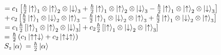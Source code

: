 \documentclass[12pt]{article}
\begin{document}
\hspace*{3em}$=c_1\left[\frac{\hbar}{2}\ket{\uparrow}_1\otimes \ket{\uparrow}_2\otimes \ket{\downarrow}_3 + \frac{\hbar}{2}\ket{\uparrow}_1\otimes \ket{\uparrow}_2\otimes \ket{\downarrow}_3 -\frac{\hbar}{2}\ket{\uparrow}_1 \otimes \ket{\uparrow}_2\otimes \ket{\downarrow}_3\right]$\vspace{0.5em}\\
\hspace*{5em}$+ \, c_2 \left[\frac{\hbar}{2}\ket{\uparrow}_1 \otimes \ket{\downarrow}_2\otimes\ket{\uparrow}_3 - \frac{\hbar}{2}\ket{\uparrow}_1\otimes\ket{\downarrow}_2\otimes\ket{\uparrow}_3 + \frac{\hbar}{2}\ket{\uparrow}_1 \otimes \ket{\downarrow}_2 \otimes \ket{\uparrow}_3\right]$\vspace{0.5em}\\
\hspace*{3em}$=c_1 \frac{\hbar}{2}\left[\ket{\uparrow}_1\otimes \ket{\uparrow}_2 \otimes \ket{\downarrow}_3\right] + c_2 \frac{\hbar}{2}\left[\ket{\uparrow}_1 \otimes \ket{\downarrow}_2 \otimes \ket{\uparrow}_3\right]$\vspace{0.5em}\\
\hspace*{3em}$= \frac{\hbar}{2} \left(c_1 \ket{\uparrow\uparrow\downarrow} + c_2\ket{\uparrow\downarrow\uparrow}\right)$\vspace{0.5em}\\
$S_z \ket{\alpha} \, = \frac{\hbar}{2}\ket{\alpha}$ \hspace{2em} \checkmark


\newpage
\end{document}
